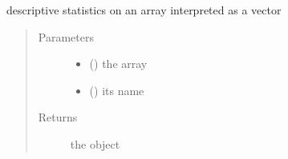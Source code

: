 \documentclass[letterpaper,10pt,english]{sphinxmanual}
\begin{document}
\begin{fulllineitems}
\label{\detokenize{ipfp_utils:ipfp_utils.describe_array}}
descriptive statistics on an array interpreted as a vector
\begin{quote}\begin{description}
\item[{Parameters}] \leavevmode\begin{itemize}
\item {} 
 () \textendash{} the array

\item {} 
 () \textendash{} its name

\end{itemize}

\item[{Returns}] \leavevmode
the  object

\end{description}\end{quote}

\end{fulllineitems}

\end{document}
